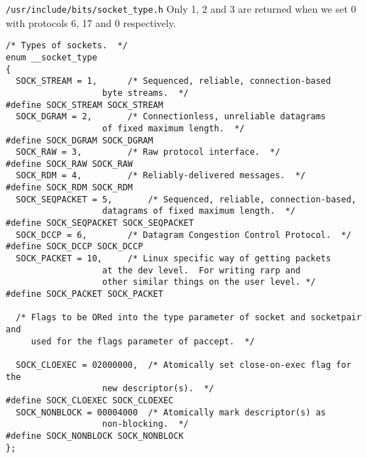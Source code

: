 \documentclass{article}
\begin{document}
\lstinline+/usr/include/bits/socket_type.h+
Only 1, 2 and 3 are returned when we set 0 with protocols 6, 17 and 0 respectively.
\begin{lstlisting}
/* Types of sockets.  */
enum __socket_type
{
  SOCK_STREAM = 1,		/* Sequenced, reliable, connection-based
				   byte streams.  */
#define SOCK_STREAM SOCK_STREAM
  SOCK_DGRAM = 2,		/* Connectionless, unreliable datagrams
				   of fixed maximum length.  */
#define SOCK_DGRAM SOCK_DGRAM
  SOCK_RAW = 3,			/* Raw protocol interface.  */
#define SOCK_RAW SOCK_RAW
  SOCK_RDM = 4,			/* Reliably-delivered messages.  */
#define SOCK_RDM SOCK_RDM
  SOCK_SEQPACKET = 5,		/* Sequenced, reliable, connection-based,
				   datagrams of fixed maximum length.  */
#define SOCK_SEQPACKET SOCK_SEQPACKET
  SOCK_DCCP = 6,		/* Datagram Congestion Control Protocol.  */
#define SOCK_DCCP SOCK_DCCP
  SOCK_PACKET = 10,		/* Linux specific way of getting packets
				   at the dev level.  For writing rarp and
				   other similar things on the user level. */
#define SOCK_PACKET SOCK_PACKET

  /* Flags to be ORed into the type parameter of socket and socketpair and
     used for the flags parameter of paccept.  */

  SOCK_CLOEXEC = 02000000,	/* Atomically set close-on-exec flag for the
				   new descriptor(s).  */
#define SOCK_CLOEXEC SOCK_CLOEXEC
  SOCK_NONBLOCK = 00004000	/* Atomically mark descriptor(s) as
				   non-blocking.  */
#define SOCK_NONBLOCK SOCK_NONBLOCK
};
\end{lstlisting}
\end{document}
